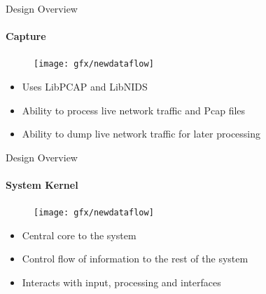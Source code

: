 \documentclass{beamer}
\begin{document}
\begin{frame}{Design Overview}
    \framesubtitle{Capture}
    \begin{figure}
        \vspace{-2em}
        \centering
        \texttt{[image: gfx/newdataflow]}
        \vspace{-1em}
    \end{figure}
    \begin{itemize}
        \item{Uses LibPCAP and LibNIDS}
        \item{Ability to process live network traffic and Pcap files}
        \item{Ability to dump live network traffic for later processing}
    \end{itemize}
\end{frame}


\begin{frame}{Design Overview}
    \framesubtitle{System Kernel}
    \begin{figure}
        \vspace{-2em}
        \centering
        \texttt{[image: gfx/newdataflow]}
        \vspace{-1em}
    \end{figure}
    \begin{itemize}
        \item{Central core to the system}
        \item{Control flow of information to the rest of the system}
        \item{Interacts with input, processing and interfaces}
    \end{itemize}
\end{frame}

\end{document}
